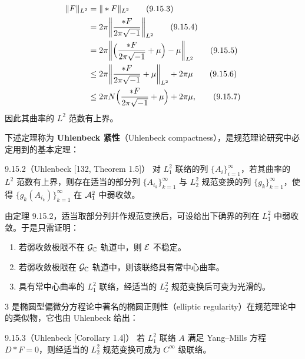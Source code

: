 \begin{align}
  \|F\|_{L^2}&=\|\ast F\|_{L^2} \tag{9.15.3}\\
  &=2\pi\biggl\|\frac{\ast F}{2\pi\sqrt{-1}}\biggr\|_{L^2} \tag{9.15.4}\\
  &=2\pi\biggl\|\Bigl(\frac{\ast F}{2\pi\sqrt{-1}}+\mu\Bigr)-\mu\biggr\|_{L^2} \tag{9.15.5}\\
  &\le2\pi\biggl\|\frac{\ast F}{2\pi\sqrt{-1}}+\mu\biggr\|_{L^2}+2\pi\mu \tag{9.15.6}\\
  &\le2\pi N\Bigl(\frac{\ast F}{2\pi\sqrt{-1}}+\mu\Bigr)+2\pi\mu, \tag{9.15.7}
\end{align}
因此其曲率的 $L^2$ 范数有上界。


下述定理称为 \textbf{Uhlenbeck 紧性}（Uhlenbeck compactness），是规范理论研究中必定用到的基本定理：

\begin{theorem}{9.15.2（Uhlenbeck [132, Theorem 1.5]）}
  对 $L^2_1$ 联络的列 $\{A_i\}_{i=1}^\infty$，若其曲率的 $L^2$ 范数有上界，则存在适当的部分列 $\{A_{i_k}\}_{k=1}^\infty$ 与 $L^2_2$ 规范变换的列 $\{g_k\}_{k=1}^\infty$，使得 $\{g_k(A_{i_k})\}_{k=1}^\infty$ 在 $\mathcal{A}^2_1$ 中弱收敛。
\end{theorem}

由定理 9.15.2，适当取部分列并作规范变换后，可设给出下确界的列在 $L^2_1$ 中弱收敛。于是只需证明：

\begin{enumerate}[label=\arabic*.,leftmargin=2em,itemsep=1pt,topsep=2pt]
  \item 若弱收敛极限不在 $\mathcal{G}_{\mathbb{C}}$ 轨道中，则 $\mathcal{E}$ 不稳定。
  \item 若弱收敛极限在 $\mathcal{G}_{\mathbb{C}}$ 轨道中，则该联络具有常中心曲率。
  \item 具有常中心曲率的 $L^2_1$ 联络，经适当的 $L^2_2$ 规范变换后可变为光滑的。
\end{enumerate}

3 是椭圆型偏微分方程论中著名的椭圆正则性（elliptic regularity）在规范理论中的类似物，它也由 Uhlenbeck 给出：

\begin{theorem}{9.15.3（Uhlenbeck [Corollary 1.4]）}
  若 $L^2_1$ 联络 $A$ 满足 Yang--Mills 方程 $D\ast F=0$，则经适当的 $L^2_2$ 规范变换可成为 $C^\infty$ 级联络。
\end{theorem}

